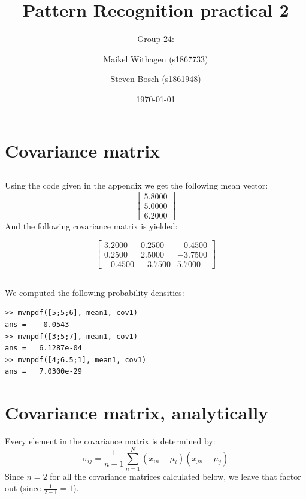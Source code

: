 \documentclass[10pt]{article}
\title{Pattern Recognition practical 2}
\author{Group 24: \and Maikel Withagen (s1867733) \and Steven Bosch (s1861948)}
\date{\today}
\begin{document}
\maketitle

\section{Covariance matrix}
\subsection{}
Using the code given in the appendix we get the following mean vector:
\begin{equation}
    \begin{bmatrix}
      5.8000 \\
      5.0000 \\
      6.2000
    \end{bmatrix}
\end{equation}
And the following covariance matrix is yielded:

  \begin{equation}
    \begin{bmatrix}
      3.2000  &  0.2500 &  -0.4500 \\
      0.2500  &  2.5000 &  -3.7500 \\
    -0.4500 &  -3.7500 &   5.7000
    \end{bmatrix}
\end{equation}

\subsection{}
We computed the following probability densities:
\begin{lstlisting}
>> mvnpdf([5;5;6], mean1, cov1)
ans =    0.0543
>> mvnpdf([3;5;7], mean1, cov1)
ans =   6.1287e-04
>> mvnpdf([4;6.5;1], mean1, cov1)
ans =   7.0300e-29
\end{lstlisting}

\section{Covariance matrix, analytically}
Every element in the covariance matrix is determined by:
\begin{equation}
\sigma_{ij} = \frac{1}{n-1} \sum_{n=1}^{N} (x_{in}-\mu_{i})(x_{jn} - \mu_{j})
\end{equation}
Since $n=2$ for all the covariance matrices calculated below, we leave that factor out (since $\frac{1}{2-1}=1$).
\end{document}
